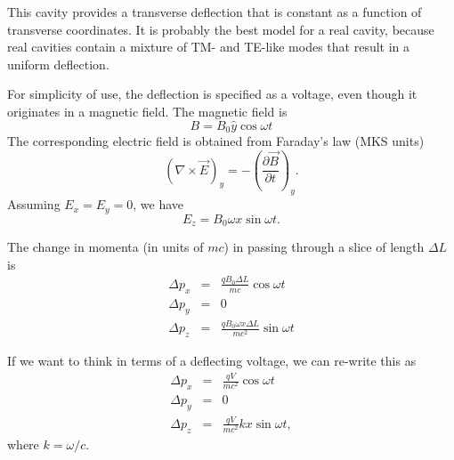 This cavity provides a transverse deflection that is constant as
a function of transverse coordinates.  It is probably the best model
for a real cavity, because real cavities contain a mixture of TM- and
TE-like modes that result in a uniform deflection.

For simplicity of use, the deflection is specified as a voltage, even 
though it originates in a magnetic field.  The magnetic field is
\begin{equation}
B = B_0 \hat{y} \cos \omega t
\end{equation}
The corresponding electric field is obtained from Faraday's law (MKS units)
\begin{equation}
\left(\nabla \times \vec{E}\right)_y = - \left(\frac{\partial \vec{B}}{\partial t}\right)_y.
\end{equation}
Assuming $E_x = E_y = 0$, we have
\begin{equation}
E_z = B_0 \omega x \sin \omega t.
\end{equation}

The change in momenta (in units of $m c$) in passing through a slice of length $\Delta L$ is
\begin{eqnarray}
\Delta p_x & = & \frac{q B_0 \Delta L}{m c} \cos \omega t \\
\Delta p_y & = & 0 \\
\Delta p_z & = & \frac{q B_0 \omega x \Delta L}{m c^2} \sin\omega t 
\end{eqnarray}

If we want to think in terms of a deflecting voltage, we can re-write this as
\begin{eqnarray}
\Delta p_x & = & \frac{q V}{m c^2} \cos \omega t \\
\Delta p_y & = & 0 \\
\Delta p_z & = & \frac{q V}{m c^2} k x \sin\omega t,
\end{eqnarray}
where $k = \omega/c$.

